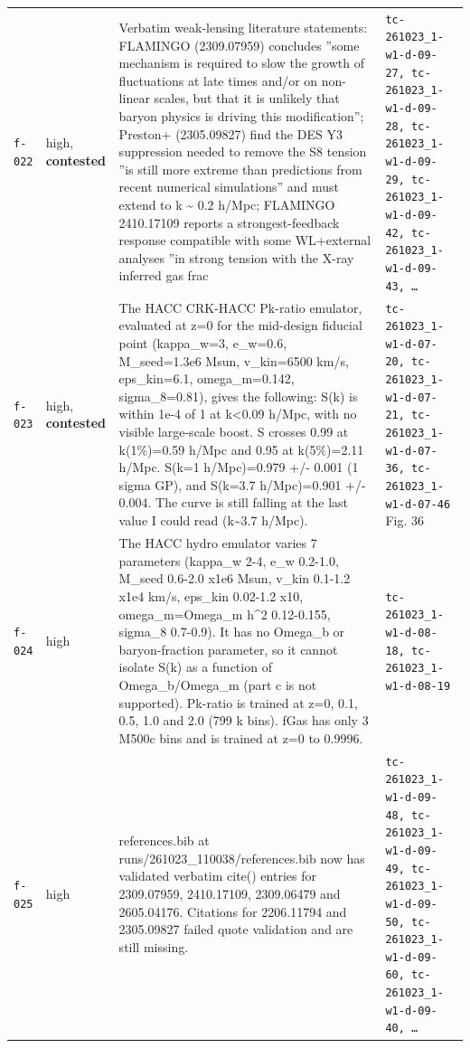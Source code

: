 \documentclass[11pt,a4paper]{article}
\begin{document}
\begin{longtable}{@{}p{}p{}p{}p{}@{}}
\texttt{f-022} & high, \textbf{contested} & Verbatim weak-lensing literature statements: FLAMINGO (2309.07959) concludes ''some mechanism is required to slow the growth of fluctuations at late times and/or on non-linear scales, but that it is unlikely that baryon physics is driving this modification''; Preston+ (2305.09827) find the DES Y3 suppression needed to remove the S8 tension ''is still more extreme than predictions from recent numerical simulations'' and must extend to k \textasciitilde{} 0.2 h/Mpc; FLAMINGO 2410.17109 reports a strongest-feedback response compatible with some WL+external analyses ''in strong tension with the X-ray inferred gas frac & \texttt{tc-261023\_\allowbreak{}1-w1-d-09-27,\allowbreak{} tc-261023\_\allowbreak{}1-w1-d-09-28,\allowbreak{} tc-261023\_\allowbreak{}1-w1-d-09-29,\allowbreak{} tc-261023\_\allowbreak{}1-w1-d-09-42,\allowbreak{} tc-261023\_\allowbreak{}1-w1-d-09-43,\allowbreak{} \ldots{}\allowbreak{}} \\
\texttt{f-023} & high, \textbf{contested} & The HACC CRK-HACC Pk-ratio emulator, evaluated at z=0 for the mid-design fiducial point (kappa\_w=3, e\_w=0.6, M\_seed=1.3e6 Msun, v\_kin=6500 km/s, eps\_kin=6.1, omega\_m=0.142, sigma\_8=0.81), gives the following: S(k) is within 1e-4 of 1 at k\textless{}0.09 h/Mpc, with no visible large-scale boost. S crosses 0.99 at k(1\%)=0.59 h/Mpc and 0.95 at k(5\%)=2.11 h/Mpc. S(k=1 h/Mpc)=0.979 +/- 0.001 (1 sigma GP), and S(k=3.7 h/Mpc)=0.901 +/- 0.004. The curve is still falling at the last value I could read (k\textasciitilde{}3.7 h/Mpc). & \texttt{tc-261023\_\allowbreak{}1-w1-d-07-20,\allowbreak{} tc-261023\_\allowbreak{}1-w1-d-07-21,\allowbreak{} tc-261023\_\allowbreak{}1-w1-d-07-36,\allowbreak{} tc-261023\_\allowbreak{}1-w1-d-07-46} Fig. 36 \\
\texttt{f-024} & high & The HACC hydro emulator varies 7 parameters (kappa\_w 2-4, e\_w 0.2-1.0, M\_seed 0.6-2.0 x1e6 Msun, v\_kin 0.1-1.2 x1e4 km/s, eps\_kin 0.02-1.2 x10, omega\_m=Omega\_m h\textasciicircum{}2 0.12-0.155, sigma\_8 0.7-0.9). It has no Omega\_b or baryon-fraction parameter, so it cannot isolate S(k) as a function of Omega\_b/Omega\_m (part c is not supported). Pk-ratio is trained at z=0, 0.1, 0.5, 1.0 and 2.0 (799 k bins). fGas has only 3 M500c bins and is trained at z=0 to 0.9996. & \texttt{tc-261023\_\allowbreak{}1-w1-d-08-18,\allowbreak{} tc-261023\_\allowbreak{}1-w1-d-08-19} \\
\texttt{f-025} & high & references.bib at runs/261023\_110038/references.bib now has validated verbatim cite() entries for 2309.07959, 2410.17109, 2309.06479 and 2605.04176. Citations for 2206.11794 and 2305.09827 failed quote validation and are still missing. & \texttt{tc-261023\_\allowbreak{}1-w1-d-09-48,\allowbreak{} tc-261023\_\allowbreak{}1-w1-d-09-49,\allowbreak{} tc-261023\_\allowbreak{}1-w1-d-09-50,\allowbreak{} tc-261023\_\allowbreak{}1-w1-d-09-60,\allowbreak{} tc-261023\_\allowbreak{}1-w1-d-09-40,\allowbreak{} \ldots{}\allowbreak{}} \\

\end{longtable}
\end{document}
